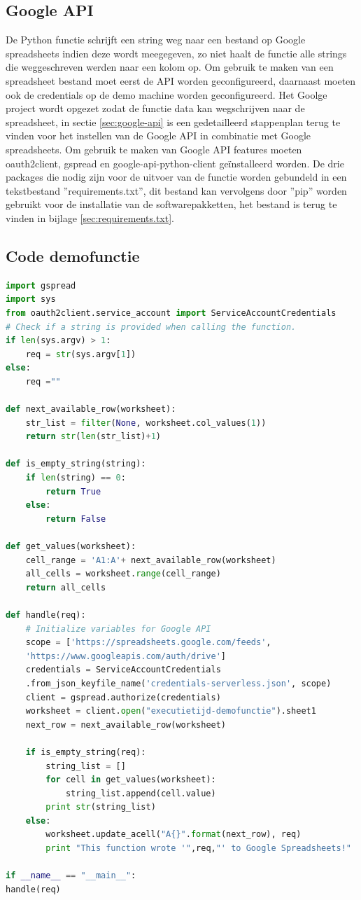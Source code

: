 \subsection{Google API}
De Python functie schrijft een string weg naar een bestand op Google spreadsheets indien deze wordt meegegeven, zo niet haalt de functie alle strings die weggeschreven werden naar een kolom op. Om gebruik te maken van een spreadsheet bestand moet eerst de API worden geconfigureerd, daarnaast moeten ook de credentials op de demo machine worden geconfigureerd. Het Goolge project wordt opgezet zodat de functie data kan wegschrijven naar de spreadsheet, in sectie \ref{sec:google-api} is een gedetailleerd stappenplan terug te vinden voor het instellen van de Google API in combinatie met Google spreadsheets. Om gebruik te maken van Google API features moeten oauth2client, gspread en google-api-python-client geïnstalleerd worden. De drie packages die nodig zijn voor de uitvoer van de functie worden gebundeld in een tekstbestand ''requirements.txt'', dit bestand kan vervolgens door ''pip'' worden gebruikt voor de installatie van de softwarepakketten, het bestand is terug te vinden in bijlage \ref{sec:requirements.txt}.

\newpage
\subsection{Code demofunctie}
\label{sec:demofunctie}
\begin{lstlisting}[language=python]
import gspread
import sys
from oauth2client.service_account import ServiceAccountCredentials
# Check if a string is provided when calling the function.
if len(sys.argv) > 1:
    req = str(sys.argv[1])
else:
    req =""

def next_available_row(worksheet):
    str_list = filter(None, worksheet.col_values(1))
    return str(len(str_list)+1)

def is_empty_string(string):
    if len(string) == 0:
        return True
    else:
        return False

def get_values(worksheet):
    cell_range = 'A1:A'+ next_available_row(worksheet)
    all_cells = worksheet.range(cell_range)
    return all_cells

def handle(req):   
    # Initialize variables for Google API
    scope = ['https://spreadsheets.google.com/feeds',
    'https://www.googleapis.com/auth/drive']
    credentials = ServiceAccountCredentials
    .from_json_keyfile_name('credentials-serverless.json', scope)
    client = gspread.authorize(credentials)
    worksheet = client.open("executietijd-demofunctie").sheet1
    next_row = next_available_row(worksheet)

    if is_empty_string(req):
        string_list = []
        for cell in get_values(worksheet):
            string_list.append(cell.value)
        print str(string_list)
    else:
        worksheet.update_acell("A{}".format(next_row), req)
        print "This function wrote '",req,"' to Google Spreadsheets!"

if __name__ == "__main__":
handle(req)
\end{lstlisting}


